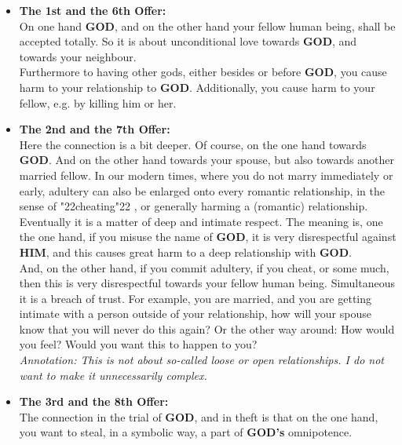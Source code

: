 \documentclass[12pt,a5paper]{article}
\newcommand{\God}[0]{\textbf{GOD}}
\newcommand{\Gods}[0]{\textbf{GOD's}}
\newcommand{\Him}[0]{\textbf{HIM}}
\newcommand{\q}[1]{\char"22{#1}\char"22 }
\begin{document}
		\begin{itemize}
			\item	\textbf{The 1st and the 6th Offer:}
					\\
					On one hand {\God},
					and on the other hand your fellow human being,
					shall be accepted totally.
					So it is about unconditional love towards {\God},
					and towards your neighbour.
					\\
					Furthermore to having other gods,
					either besides or before {\God},
					you cause harm to your relationship to {\God}.
					Additionally,
					you cause harm to your fellow,
					e.g. by killing him or her.
			\item	\textbf{The 2nd and the 7th Offer:}
					\\
					Here the connection is a bit deeper.
					Of course,
					on the one hand towards {\God}.
					And on the other hand towards your spouse,
					but also towards another married fellow.
					In our modern times,
					where you do not marry immediately or early,
					adultery can also be enlarged onto every romantic relationship,
					in the sense of \q{cheating},
					or generally harming a (romantic) relationship.
					\\
					Eventually it is a matter of deep and intimate respect.
					The meaning is,
					one the one hand,
					if you misuse the name of {\God},
					it is very disrespectful against {\Him},
					and this causes great harm to a deep relationship with {\God}.
					\\
					And,
					on the other hand,
					if you commit adultery,
					if you cheat,
					or some much,
					then this is very disrespectful towards your fellow human being.
					Simultaneous it is a breach of trust.
					For example,
					you are married,
					and you are getting intimate with a person outside of your relationship,
					how will your spouse know that you will never do this again?
					Or the other way around:
					How would you feel?
					Would you want this to happen to you?
					\\
					\textit{Annotation:
					This is not about so-called
					loose or open relationships.
					I do not want to make it unnecessarily complex.}
			\item	\textbf{The 3rd and the 8th Offer:}
					\\
					The connection in the trial of {\God},
					and in theft is that on the one hand,
					you want to steal,
					in a symbolic way,
					a part of {\Gods} omnipotence.
					\\

\end{itemize}
\end{document}
